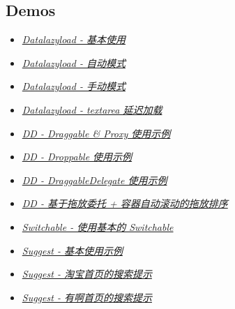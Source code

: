 \documentclass[letterpaper,10pt,english]{sphinxmanual}
\begin{document}
\subsection{Demos}
\label{demo/component/index:demos}\begin{itemize}
\item {}
{\hyperref[demo/component/datalazyload/index:component-datalazyload-demo1]{\emph{Datalazyload - 基本使用}}}

\item {}
{\hyperref[demo/component/datalazyload/index:component-datalazyload-demo2]{\emph{Datalazyload - 自动模式}}}

\item {}
{\hyperref[demo/component/datalazyload/index:component-datalazyload-demo3]{\emph{Datalazyload - 手动模式}}}

\item {}
{\hyperref[demo/component/datalazyload/index:component-datalazyload-demo4]{\emph{Datalazyload - textarea 延迟加载}}}

\item {}
{\hyperref[demo/component/dd/draggable:component-dd-demo1]{\emph{DD - Draggable \& Proxy 使用示例}}}

\item {}
{\hyperref[demo/component/dd/droppable:component-dd-demo2]{\emph{DD - Droppable 使用示例}}}

\item {}
{\hyperref[demo/component/dd/draggable-delegate:component-dd-demo3]{\emph{DD - DraggableDelegate 使用示例}}}

\item {}
{\hyperref[demo/component/dd/droppable-delegate:component-dd-demo4]{\emph{DD - 基于拖放委托 + 容器自动滚动的拖放排序}}}

\item {}
{\hyperref[demo/component/switchable/index:component-switchable-demo1]{\emph{Switchable - 使用基本的 Switchable}}}

\item {}
{\hyperref[demo/component/suggest/index:component-suggest-demo0]{\emph{Suggest - 基本使用示例}}}

\item {}
{\hyperref[demo/component/suggest/index:component-suggest-demo1]{\emph{Suggest - 淘宝首页的搜索提示}}}

\item {}
{\hyperref[demo/component/suggest/index:component-suggest-demo2]{\emph{Suggest - 有啊首页的搜索提示}}}


\end{itemize}
\end{document}
